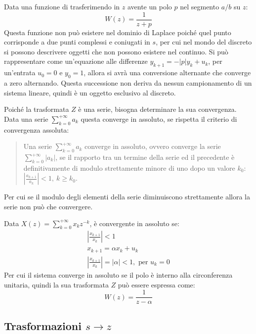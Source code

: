 \documentclass{article}
\numberwithin{equation}{subsection}
\begin{document}
Data una funzione di trasferimendo in $z$ avente un polo $p$ nel segmento $a/b$ su $z$:
\begin{equation}
    W(z)=\displaystyle\frac{1}{z+p}
\end{equation}
Questa funzione non può esistere nel dominio di Laplace poiché quel punto corrisponde a due punti complessi e coniugati in $s$, per cui nel mondo del discreto si possono 
descrivere oggetti che non possono esistere nel continuo. Si può rappresentare come un'equazione alle differenze $y_{k+1}=-|p|y_k+u_k$, per un'entrata $u_0=0$ e $y_0=1$, 
allora si avrà una conversione alternante che converge a zero alternando. Questa successione non deriva da nessun campionamento di un sistema lineare, quindi è un oggetto 
esclusivo al discreto. 

Poiché la trasformata $Z$ è una serie, bisogna determinare la sua convergenza. Data una serie $\displaystyle\sum_{k=0}^{+\infty}a_k$ questa converge in assoluto, se rispetta il 
criterio di convergenza assoluta:
\begin{quotation}
    Una serie $\displaystyle\sum_{k=0}^{+\infty}a_k$ converge in assoluto, ovvero converge la serie $\displaystyle\sum_{k=0}^{+\infty}|a_k|$, se il rapporto tra un termine della serie ed il precedente 
    è definitivamente di modulo strettamente minore di uno dopo un valore $k_0$: $\displaystyle\left|\frac{a_{k+1}}{a_k}\right|<1,\:k\geq k_0$.
\end{quotation}
Per cui se il modulo degli elementi della serie diminuiscono strettamente allora la serie non può che convergere. 

Data $X(z)=\displaystyle\sum_{k=0}^{+\infty}x_kz^{-k}$, è convergente in assoluto se:
\begin{gather}
    \left|\displaystyle\frac{x_{k+1}}{x_k}\right|<1\\
    x_{k+1}=\alpha x_k+u_k\\
    \left|\displaystyle\frac{x_{k+1}}{x_k}\right|=|\alpha|<1,\mbox{ per }u_k=0
\end{gather}
Per cui il sistema converge in assoluto se il polo è interno alla circonferenza unitaria, quindi la sua trasformata $Z$ può essere espressa come:
\begin{equation}
    W(z)=\displaystyle\frac{1}{z-\alpha}
\end{equation}

\subsection{Trasformazioni $s\to z$}
\end{document}
